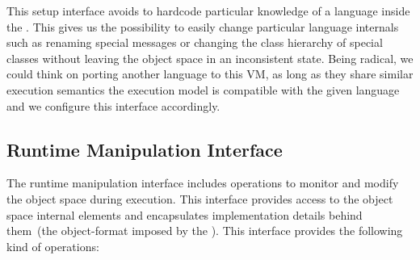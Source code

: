 This \VM setup interface avoids to hardcode particular knowledge of a language inside the \VM. This gives us the possibility to easily change particular language internals such as renaming special messages or changing the class hierarchy of special classes without leaving the object space in an inconsistent state. Being radical, we could think on porting another language to this VM, as long as they share similar execution semantics \ie the \VM execution model is compatible with the given language and we configure this interface accordingly.



\subsection{Runtime Manipulation Interface} 
The runtime manipulation interface includes operations to monitor and modify the object space during execution. This interface provides access to the object space internal elements and encapsulates implementation details behind them~(\ie the object-format imposed by the \VM). This interface provides the following kind of operations:

